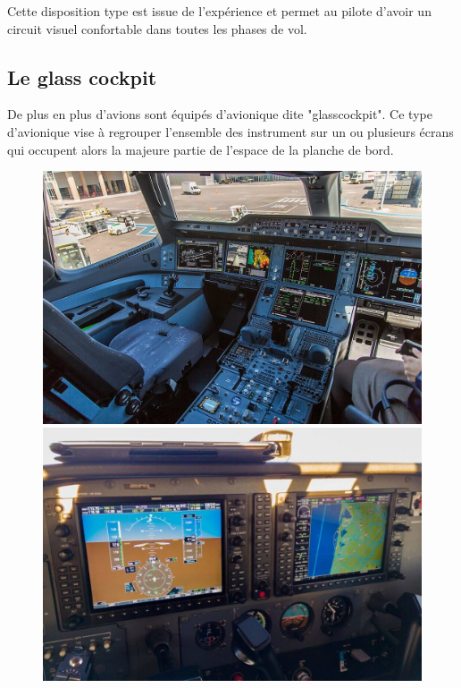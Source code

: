 	Cette disposition type est issue de l'expérience et permet au pilote d'avoir un circuit visuel confortable dans toutes les phases de vol.
	
	\subsection{Le glass cockpit}
	
	De plus en plus d'avions sont équipés d'avionique dite "\gls{glasscockpit}". Ce type d'avionique vise à regrouper l'ensemble des instrument sur un ou plusieurs écrans qui occupent alors la majeure partie de l'espace de la planche de bord.
	
	\begin{figure}[H]
	\begin{minipage}[c]{0.5\linewidth}
	\includegraphics[width=\linewidth]{01-EtudeAeronefs/img/A350Cockpit.jpg}
	\end{minipage}
	\hfill
	\begin{minipage}[c]{0.5\linewidth}
	\includegraphics[width=\linewidth]{01-EtudeAeronefs/img/C172glassCockpit.jpg}
	\end{minipage}
	\end{figure}
	

